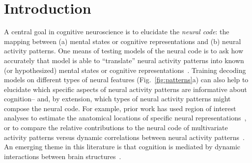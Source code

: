 \documentclass[english]{article}
\begin{document}
\section*{Introduction}
A central goal in cognitive neuroscience is to elucidate the
\textit{neural code}: the mapping between (a) mental states or
cognitive representations and (b) neural activity patterns. One means
of testing models of the neural code is to ask how accurately that
model is able to ``translate'' neural activity patterns into known (or
hypothesized) mental states or cognitive
representations~\citep[e.g.,][]{HaxbEtal01, NormEtal06, TongPrat12,
  MitcEtal08a, KamiTong05, NishEtal11, PereEtal18, HuthEtal12,
  HuthEtal16}.  Training decoding models on different types of neural
features (Fig.~\ref{fig:patterns}a) can also help to elucidate which
specific aspects of neural activity patterns are informative about
cognition-- and, by extension, which types of neural activity patterns
might compose the neural code.  For example, prior work has used
region of interest analyses to estimate the anatomical locations of
specific neural representations~\citep[e.g.,][]{EtzeEtal09}, or to
compare the relative contributions to the neural code of multivariate
activity patterns versus dynamic correlations between neural activity
patterns~\citep[e.g.,][]{MannEtal18, FongEtal19}.  An emerging theme
in this literature is that cognition is mediated by dynamic
interactions between brain structures~\citep{Gros88, Fris00, SporHone06, BassEtal06,
  Turk13, DemeEtal19, SoloEtal19, LuriEtal18, PretEtal17, ZouEtal19,
  MackEtal17}.
\end{document}
